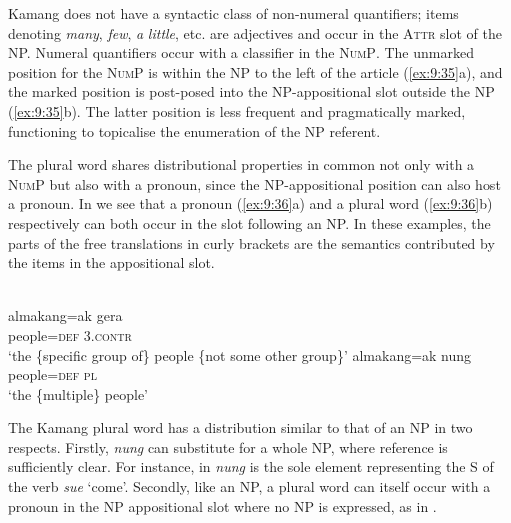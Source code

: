 Kamang does not have a syntactic class of non-numeral quantifiers; items denoting \textit{many}, \textit{few}, \textit{a} \textit{little}, etc. are adjectives and occur in the \textsc{Attr} slot of the NP. Numeral quantifiers occur with a classifier in the \textsc{NumP}. The unmarked position for the \textsc{NumP} is within the NP to the left of the article (\ref{ex:9:35}a), and the marked position is post-posed into the NP-appositional slot outside the NP (\ref{ex:9:35}b). The latter position is less frequent and pragmatically marked, functioning to topicalise the enumeration of the NP referent.


The plural word shares distributional properties in common not only with a \textsc{NumP} but also with a pronoun, since the NP-appositional position can also host a pronoun. In  we see that a pronoun (\ref{ex:9:36}a) and a plural word (\ref{ex:9:36}b) respectively can both occur in the slot following an NP. In these examples, the parts of the free translations in curly brackets are the semantics contributed by the items in the appositional slot.


\ea%
\label{ex:9:36}
 \\
\ea
\gll almakang=ak gera  \\
 people=\textsc{def} \textsc{3.contr}   \\
\glt `the \{specific group of\} people \{not some other group\}'
\ex
\gll almakang=ak nung \\
  people=\textsc{def} \textsc{pl}   \\
\glt  `the \{multiple\} people'
\z
\z






The Kamang plural word has a distribution similar to that of an NP in two respects. Firstly, \textit{nung} can substitute for a whole NP, where reference is sufficiently clear. For instance, in  \textit{nung} is the sole element representing the S of the verb \textit{sue} `come'. Secondly, like an NP, a plural word can itself occur with a pronoun in the NP appositional slot where no NP is expressed, as in .


